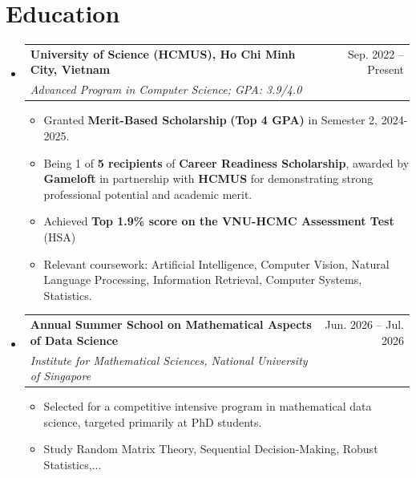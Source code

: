 \documentclass[letterpaper,11pt]{article}
\makeatletter
\newcommand{\resumeItem}[1]{
  \item\small{
    {#1 \vspace{-2pt}}
  }
}
\newcommand{\resumeSubhead}[3]{
  \vspace{-1pt}\item
    \begin{tabular*}{0.97\textwidth}{l@{\extracolsep{\fill}}r}
      \textbf{#1} & #2 \\
      \textit{\normalsize#3}
    \end{tabular*}\vspace{-5pt}
}
\newcommand{\resumeSubHeadingListStart}{\begin{itemize}[leftmargin=*]}
\newcommand{\resumeSubHeadingListEnd}{\end{itemize}}
\newcommand{\resumeItemListStart}{\begin{itemize}}
\newcommand{\resumeItemListEnd}{\end{itemize}\vspace{-5pt}}
\makeatother
\begin{document}
\section{Education}
  \resumeSubHeadingListStart
    \resumeSubhead
        {University of Science (HCMUS), Ho Chi Minh City, Vietnam}{Sep. 2022 -- Present}
        {Advanced Program in Computer Science;  GPA: 3.9/4.0}
        \resumeItemListStart
            \resumeItem{Granted \textbf{Merit-Based Scholarship} \textbf{(Top 4 GPA)} in Semester 2, 2024-2025.}
            \resumeItem{Being 1 of \textbf{5 recipients} of \textbf{Career Readiness Scholarship}, awarded by \textbf{Gameloft} in partnership with \textbf{HCMUS} for demonstrating strong professional potential and academic merit.}
            \resumeItem{Achieved \textbf{Top 1.9\% score on the VNU-HCMC Assessment Test} (HSA)}
            \resumeItem{Relevant coursework: Artificial Intelligence, Computer Vision, Natural Language Processing, Information Retrieval, Computer Systems, Statistics.}
        \resumeItemListEnd

        \resumeSubhead
      {Annual Summer School on Mathematical Aspects of Data Science}{Jun. 2026 -- Jul. 2026}{Institute for Mathematical Sciences, National University of Singapore}
    \resumeItemListStart
        \resumeItem{Selected for a competitive intensive program in mathematical data science, targeted primarily at PhD students.}
        \resumeItem{Study Random Matrix Theory, Sequential Decision-Making, Robust Statistics,...}
    \resumeItemListEnd


  \resumeSubHeadingListEnd
\end{document}
